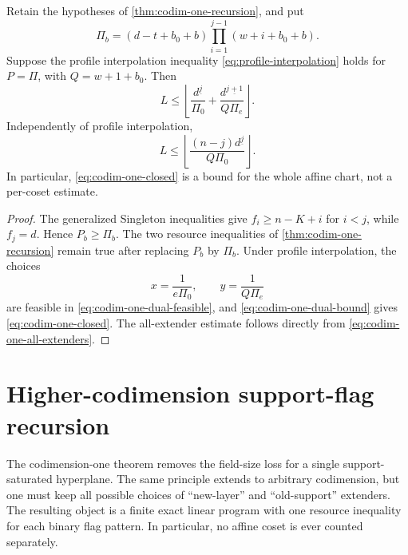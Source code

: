 \documentclass[11pt,a4paper]{amsart}
\numberwithin{equation}{section}
\theoremstyle{remark}
\begin{document}
\begin{corollary}
\label{cor:codim-one-mds-soft}
Retain the hypotheses of \cref{thm:codim-one-recursion}, and put
\begin{equation}
 \Pi_b=(d-t+b_0+b)
 \prod_{i=1}^{j-1}(w+i+b_0+b).
 \label{eq:codim-one-mds-profile}
\end{equation}
Suppose the profile interpolation inequality
\eqref{eq:profile-interpolation} holds for \(P=\Pi\), with
\(Q=w+1+b_0\).  Then
\begin{equation}
 L\le
 \left\lfloor
 \frac{d^{\underline j}}{\Pi_0}+
 \frac{d^{\underline{j+1}}}{Q\Pi_e}
 \right\rfloor .
 \label{eq:codim-one-closed}
\end{equation}
Independently of profile interpolation,
\begin{equation}
 L\le
 \left\lfloor
 \frac{(n-j)d^{\underline j}}{Q\Pi_0}
 \right\rfloor .
 \label{eq:codim-one-all-extenders-mds}
\end{equation}
In particular, \eqref{eq:codim-one-closed} is a bound for the whole affine
chart, not a per-coset estimate.
\end{corollary}

\begin{proof}
The generalized Singleton inequalities give \(f_i\ge n-K+i\) for
\(i<j\), while \(f_j=d\).  Hence \(P_b\ge\Pi_b\).  The two resource
inequalities of \cref{thm:codim-one-recursion} remain true after replacing
\(P_b\) by \(\Pi_b\).  Under profile interpolation, the choices
\[
 x=\frac1{e\Pi_0},\qquad y=\frac1{Q\Pi_e}
\]
are feasible in \eqref{eq:codim-one-dual-feasible}, and
\eqref{eq:codim-one-dual-bound} gives
\eqref{eq:codim-one-closed}.  The all-extender estimate follows directly
from \eqref{eq:codim-one-all-extenders}.
\end{proof}



\section{Higher-codimension support-flag recursion}
\label{sec:support-flag-recursion}
The codimension-one theorem removes the field-size loss for a single
support-saturated hyperplane.  The same principle extends to arbitrary
codimension, but one must keep all possible choices of ``new-layer'' and
``old-support'' extenders.  The resulting object is a finite exact linear
program with one resource inequality for each binary flag pattern.  In
particular, no affine coset is ever counted separately.
\end{document}
